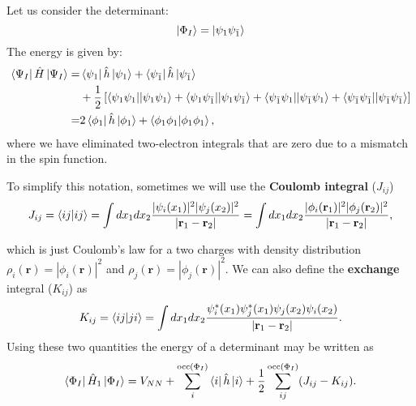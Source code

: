 \documentclass[../Main/chem532-notes.tex]{subfiles}
\begin{document}
\begin{example}
Let us consider the determinant:
\begin{equation}
\ket{\Phi_I} = \ket{\psi_1 \psi_{\bar{1}}}
\end{equation}
The energy is given by:
\begin{equation}
\begin{split}
\bra{\Psi_I} \hat{H} \ket{\Psi_I} =& \bra{\psi_1}\hat{h}\ket{\psi_1} + \bra{\psi_{\bar{1}}} \hat{h} \ket{\psi_{\bar{1}}}\\ 
&+ \frac{1}{2} \left[ 
\bra{\psi_1 \psi_1}\!\ket{\psi_1 \psi_1}
+ \bra{\psi_1\psi_{\bar{1}}}\!\ket{\psi_1\psi_{\bar{1}}} 
+ \bra{\psi_{\bar{1}}\psi_1}\!\ket{\psi_{\bar{1}}\psi_1} + \bra{\psi_{\bar{1}}\psi_{\bar{1}}}\!\ket{ \psi_{\bar{1}}\psi_{\bar{1}}}\right] \\
=& 2 \bra{\phi_1}\hat{h}\ket{\phi_1} + \braket{\phi_1 \phi_1| \phi_1 \phi_1},
\end{split}
\end{equation}
where we have eliminated two-electron integrals that are zero due to a mismatch in the spin function.
\end{example}

To simplify this notation, sometimes we will use the \textbf{Coulomb integral} ($J_{ij}$)
\begin{equation}
J_{ij} =\braket{ij|ij} = 
\int dx_1 dx_2 \frac{|\psi_{i}(x_1)|^2 |\psi_{j}(x_2)|^2 }{|\mathbf{r}_1 - \mathbf{r}_2|}
= \int dx_1 dx_2 \frac{|\phi_{i}(\mathbf{r}_1)|^2 |\phi_{j}(\mathbf{r}_2)|^2 }{|\mathbf{r}_1 - \mathbf{r}_2|},
\end{equation}

which is just Coulomb's law for a two charges with density distribution $\rho_i(\mathbf{r}) = |\phi_{i}(\mathbf{r})|^2$ and $\rho_j(\mathbf{r}) = |\phi_{j}(\mathbf{r})|^2$.
We can also define the \textbf{exchange} integral ($K_{ij}$) as
\begin{equation}
K_{ij} =\braket{ij|ji} = 
\int dx_1 dx_2 \frac{\psi_{i}^{*}(x_1) \psi_{j}^{*}(x_1) \psi_{j}(x_2) \psi_{i}(x_2) }{|\mathbf{r}_1 - \mathbf{r}_2|}.
\end{equation}
Using these two quantities the energy of a determinant may be written as
\begin{equation}
\bra{\Phi_I} \hat{H}_1 \ket{\Phi_I} = V_{NN}
+ \sum_i^{\mathrm{occ}(\Phi_I)} \bra{i}\hat{h}\ket{i}
+ \frac{1}{2} \sum_{ij}^{\mathrm{occ}(\Phi_I)} (J_{ij} - K_{ij}).
\end{equation}
\end{document}
